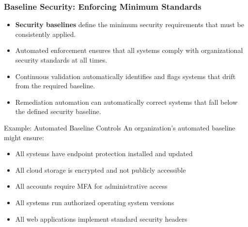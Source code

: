 \documentclass{beamer}
\begin{document}
\begin{frame}
  \frametitle{Baseline Security: Enforcing Minimum Standards}
  
  \begin{itemize}
    \item \textbf{Security baselines} define the minimum security requirements that must be consistently applied.
    \item Automated enforcement ensures that all systems comply with organizational security standards at all times.
    \item Continuous validation automatically identifies and flags systems that drift from the required baseline.
    \item Remediation automation can automatically correct systems that fall below the defined security baseline.
  \end{itemize}
  
  \begin{exampleblock}{Example: Automated Baseline Controls}
    \scriptsize
    An organization's automated baseline might ensure:
    \begin{itemize}
      \item All systems have endpoint protection installed and updated
      \item All cloud storage is encrypted and not publicly accessible
      \item All accounts require MFA for administrative access
      \item All systems run authorized operating system versions
      \item All web applications implement standard security headers
    \end{itemize}
  \end{exampleblock}
\end{frame}
\end{document}
